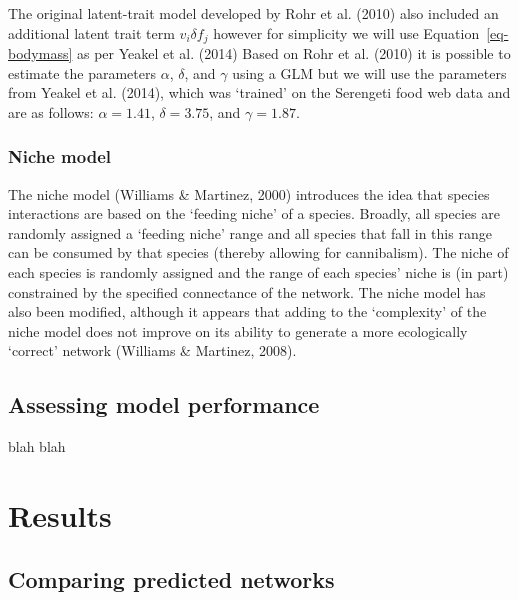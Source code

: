 \documentclass[
]{article}
\begin{document}
The original latent-trait model developed by Rohr et al. (2010) also
included an additional latent trait term \(v_{i} \delta f_{j}\) however
for simplicity we will use Equation~\ref{eq-bodymass} as per Yeakel et
al. (2014) Based on Rohr et al. (2010) it is possible to estimate the
parameters \(\alpha\), \(\delta\), and \(\gamma\) using a GLM but we
will use the parameters from Yeakel et al. (2014), which was `trained'
on the Serengeti food web data and are as follows: \(\alpha = 1.41\),
\(\delta = 3.75\), and \(\gamma = 1.87\).

\subsubsection{Niche model}\label{niche-model}

The niche model (Williams \& Martinez, 2000) introduces the idea that
species interactions are based on the `feeding niche' of a species.
Broadly, all species are randomly assigned a `feeding niche' range and
all species that fall in this range can be consumed by that species
(thereby allowing for cannibalism). The niche of each species is
randomly assigned and the range of each species' niche is (in part)
constrained by the specified connectance of the network. The niche model
has also been modified, although it appears that adding to the
`complexity' of the niche model does not improve on its ability to
generate a more ecologically `correct' network (Williams \& Martinez,
2008).

\subsection{Assessing model
performance}\label{assessing-model-performance}

blah blah

\section{Results}\label{results}

\subsection{Comparing predicted
networks}\label{comparing-predicted-networks}
\end{document}

